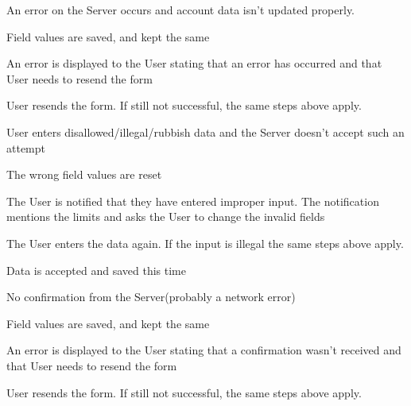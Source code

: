 \begin{packed_item}
\begin{packed_item}
						\item[7.a] An error on the Server occurs and account data isn't updated properly.
						\item[] \begin{packed_enum}
							\item Field values are saved, and kept the same
							\item An error is displayed to the User stating that an error has occurred and that User needs to resend the form
							\item User resends the form. If still not successful, the same steps above apply.
						\end{packed_enum}
							
						\item[7.b] User enters disallowed/illegal/rubbish data and the Server doesn't accept such an attempt
						\item[] \begin{packed_enum}
							\item The wrong field values are reset
							\item The User is notified that they have entered improper input. The notification mentions the limits and asks the User to change the invalid fields
							\item The User enters the data again. If the input is illegal the same steps above apply.
							\item Data is accepted and saved this time
						\end{packed_enum}
					
						\item[7.c] No confirmation from the Server(probably a network error)
						\item[] \begin{packed_enum}
							\item Field values are saved, and kept the same
							\item An error is displayed to the User stating that a confirmation wasn't received and that User needs to resend the form
							\item User resends the form. If still not successful, the same steps above apply.
						\end{packed_enum}								
							
					\end{packed_item}
							
				\end{packed_item}
					

